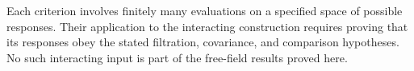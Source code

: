 Each criterion involves finitely many evaluations on a specified space of possible responses. Their
application to the interacting construction requires proving that its
responses obey the stated filtration, covariance, and comparison
hypotheses. No such interacting input is part of the free-field results
proved here.
